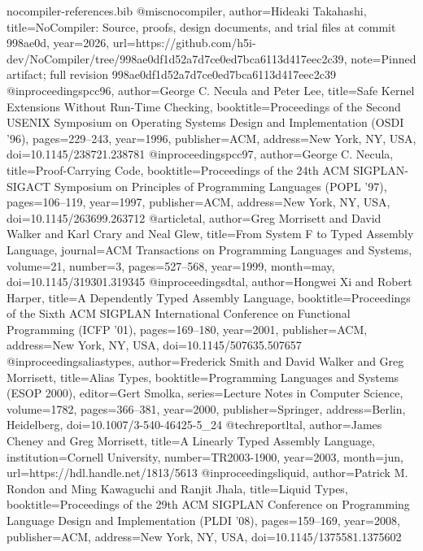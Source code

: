 \begin{filecontents*}[overwrite]{nocompiler-references.bib}
@misc{nocompiler, author={Hideaki Takahashi}, title={{NoCompiler}: Source, proofs, design documents, and trial files at commit 998ae0d}, year={2026}, url={https://github.com/h5i-dev/NoCompiler/tree/998ae0df1d52a7d7ce0ed7bca6113d417eec2c39}, note={Pinned artifact; full revision 998ae0df1d52a7d7ce0ed7bca6113d417eec2c39}}
@inproceedings{pcc96, author={George C. Necula and Peter Lee}, title={Safe Kernel Extensions Without Run-Time Checking}, booktitle={Proceedings of the Second USENIX Symposium on Operating Systems Design and Implementation (OSDI '96)}, pages={229--243}, year={1996}, publisher={ACM}, address={New York, NY, USA}, doi={10.1145/238721.238781}}
@inproceedings{pcc97, author={George C. Necula}, title={Proof-Carrying Code}, booktitle={Proceedings of the 24th ACM SIGPLAN-SIGACT Symposium on Principles of Programming Languages (POPL '97)}, pages={106--119}, year={1997}, publisher={ACM}, address={New York, NY, USA}, doi={10.1145/263699.263712}}
@article{tal, author={Greg Morrisett and David Walker and Karl Crary and Neal Glew}, title={From System {F} to Typed Assembly Language}, journal={ACM Transactions on Programming Languages and Systems}, volume={21}, number={3}, pages={527--568}, year={1999}, month=may, doi={10.1145/319301.319345}}
@inproceedings{dtal, author={Hongwei Xi and Robert Harper}, title={A Dependently Typed Assembly Language}, booktitle={Proceedings of the Sixth ACM SIGPLAN International Conference on Functional Programming (ICFP '01)}, pages={169--180}, year={2001}, publisher={ACM}, address={New York, NY, USA}, doi={10.1145/507635.507657}}
@inproceedings{aliastypes, author={Frederick Smith and David Walker and Greg Morrisett}, title={Alias Types}, booktitle={Programming Languages and Systems (ESOP 2000)}, editor={Gert Smolka}, series={Lecture Notes in Computer Science}, volume={1782}, pages={366--381}, year={2000}, publisher={Springer}, address={Berlin, Heidelberg}, doi={10.1007/3-540-46425-5_24}}
@techreport{ltal, author={James Cheney and Greg Morrisett}, title={A Linearly Typed Assembly Language}, institution={Cornell University}, number={TR2003-1900}, year={2003}, month=jun, url={https://hdl.handle.net/1813/5613}}
@inproceedings{liquid, author={Patrick M. Rondon and Ming Kawaguchi and Ranjit Jhala}, title={Liquid Types}, booktitle={Proceedings of the 29th ACM SIGPLAN Conference on Programming Language Design and Implementation (PLDI '08)}, pages={159--169}, year={2008}, publisher={ACM}, address={New York, NY, USA}, doi={10.1145/1375581.1375602}}

\end{filecontents*}
